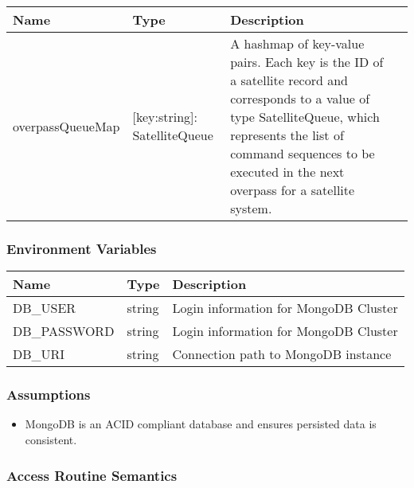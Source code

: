 \documentclass[12pt, titlepage]{article}
\begin{document}
\begin{center}
\begin{tabular}{|p{4.8cm} |p{3cm} |p{5cm} |p{4cm}|}
\hline
\textbf{Name} & \textbf{Type} & \textbf{Description} \\
\hline
overpassQueueMap & { [key:string]:
   SatelliteQueue } & A hashmap of key-value pairs. Each key is the ID of a satellite record and corresponds to a value of type SatelliteQueue, which represents the list of command sequences to be executed in the next overpass for a satellite system.\\
\hline

\end{tabular}

\end{center}

\subsubsection{Environment Variables}

\begin{center}

\begin{tabular}{|p{5cm} |p{5cm} |p{5cm}|}
\hline
\textbf{Name} & \textbf{Type} & \textbf{Description} \\
\hline
DB\_USER & string & Login information for MongoDB Cluster \\
\hline
DB\_PASSWORD & string & Login information for MongoDB Cluster \\
\hline
DB\_URI & string & Connection path to MongoDB instance \\
\hline
\end{tabular}
\end{center}

\subsubsection{Assumptions}

\begin{itemize}
    \item MongoDB is an ACID compliant database and ensures persisted data is consistent.
\end{itemize}

\subsubsection{Access Routine Semantics}
\end{document}

